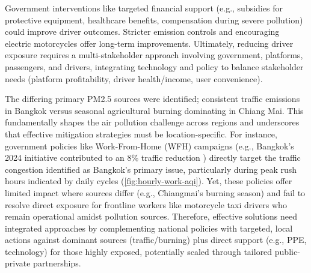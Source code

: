 Government interventions like targeted financial support (e.g., subsidies for protective equipment, healthcare benefits, compensation during severe pollution) could improve driver outcomes.
Stricter emission controls and encouraging electric motorcycles offer long-term improvements.
Ultimately, reducing driver exposure requires a multi-stakeholder approach involving government, platforms, passengers, and drivers, integrating technology and policy to balance stakeholder needs (platform profitability, driver health/income, user convenience).

The differing primary PM2.5 sources were identified; consistent traffic emissions in Bangkok versus seasonal agricultural burning dominating in Chiang Mai. 
This fundamentally shapes the air pollution challenge across regions and underscores that effective mitigation strategies must be location-specific. 
For instance, government policies like Work-From-Home (WFH) campaigns (e.g., Bangkok's 2024 initiative contributed to an 8\% traffic reduction  \cite{Wipatayotin_2025}) directly target the traffic congestion identified as Bangkok's primary issue, particularly during peak rush hours indicated by daily cycles (\autoref{fig:hourly-work-aqi}). 
Yet, these policies offer limited impact where sources differ (e.g., Chiangmai's burning season) and fail to resolve direct exposure for frontline workers like motorcycle taxi drivers who remain operational amidst pollution sources.
Therefore, effective solutions need integrated approaches by complementing national policies with targeted, local actions against dominant sources (traffic/burning) plus direct support (e.g., PPE, technology) for those highly exposed, potentially scaled through tailored public-private partnerships.

